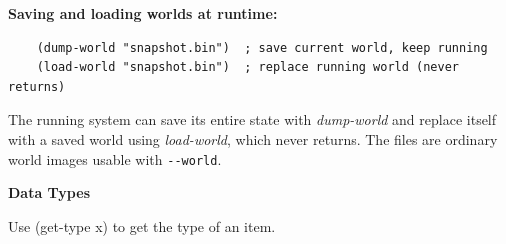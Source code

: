 \documentclass[12pt]{article}
\begin{document}
{\large \bfseries Saving and loading worlds at runtime:}
\smallskip
\begin{verbatim}
    (dump-world "snapshot.bin")  ; save current world, keep running
    (load-world "snapshot.bin")  ; replace running world (never returns)
\end{verbatim}

The running system can save its entire state with \emph{dump-world} and
replace itself with a saved world using \emph{load-world}, which never
returns.  The files are ordinary world images usable with \texttt{-{}-world}.

\newpage

{\Large \bfseries Data Types}

Use {\ttfamily (get-type x)} to get the type of an item.

\hspace{.75in}
\end{document}
